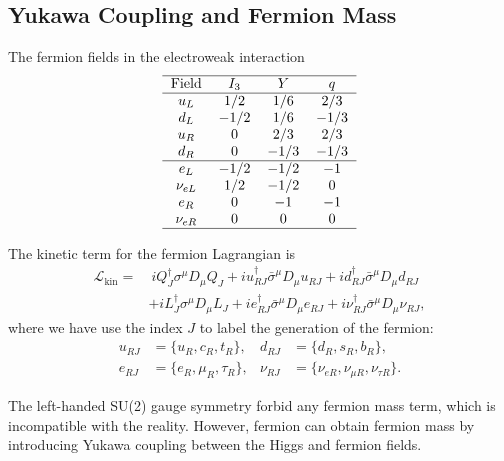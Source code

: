 \subsection{Yukawa Coupling and Fermion Mass}
The fermion fields in the electroweak interaction
\begin{equation}
	\begin{tabular}{c c c c}
		\hline 
		Field & $I_3$ & $Y$ & $q$\\ \hline
		$u_L$ & $1/2$ & $1/6$ & $2/3$ \\ 
		$d_L$ & $-1/2$ & $1/6$ & $-1/3$ \\  
		$u_R$ & $0$ & $2/3$ & $2/3$ \\
		$d_R$ & $0$ & $-1/3$ & $-1/3$ \\ \hline
		$e_L$ & $-1/2$ & $-1/2$ & $-1$ \\ 
		$\nu_{eL}$ & $1/2$ & $-1/2$ & $0$ \\  
		$e_R$ & $0$ & $-1$ & $-1$ \\
		$\nu_{eR}$ & $0$ & $0$ & $0$ \\
		\hline 
	\end{tabular}
\end{equation}

The kinetic term for the fermion Lagrangian is
\begin{equation}
\begin{aligned}
	\mathcal L_{\mathrm{kin}}
	=&\ i Q^\dagger_J \sigma^\mu D_\mu Q_J + i u_{RJ}^\dagger \bar\sigma^\mu D_\mu u_{RJ} + i d_{RJ}^\dagger \bar\sigma^\mu D_\mu d_{RJ} \\
	& + i L^\dagger_J \sigma^\mu D_\mu L_J + i e_{RJ}^\dagger \bar\sigma^\mu D_\mu e_{RJ} + i \nu_{RJ}^\dagger \bar\sigma^\mu D_\mu \nu_{RJ},
\end{aligned}
\end{equation}
where we have use the index $J$ to label the generation of the fermion:
\begin{equation}
\begin{aligned}
	u_{RJ} &= \{u_R, c_R, t_R\}, & 
	d_{RJ} &= \{d_R, s_R, b_R\}, \\
	e_{RJ} &= \{e_R, \mu_R, \tau_R\}, &
	\nu_{RJ} &= \{\nu_{eR},\nu_{\mu R},\nu_{\tau R}\}.
\end{aligned}
\end{equation}

The left-handed SU(2) gauge symmetry forbid any fermion mass term, which is incompatible with the reality.
However, fermion can obtain fermion mass by introducing Yukawa coupling between the Higgs and fermion fields.

